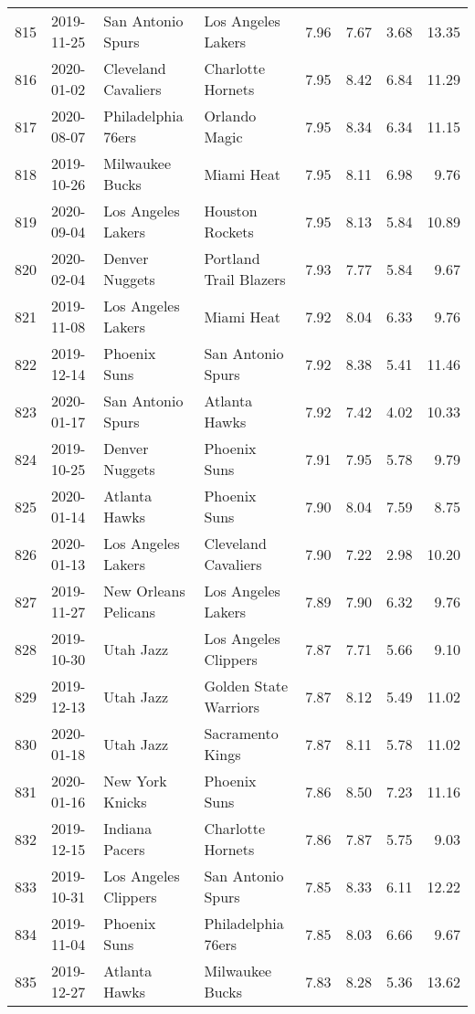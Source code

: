 \documentclass[
  11pt,
]{article}
\theoremstyle{nonumberplain}
\begin{document}
\begin{longtable}{rl|llr|rrr}
815 & 2019-11-25 & San Antonio Spurs & Los Angeles Lakers & 7.96 & 7.67 & 3.68 & 13.35\\
816 & 2020-01-02 & Cleveland Cavaliers & Charlotte Hornets & 7.95 & 8.42 & 6.84 & 11.29\\
817 & 2020-08-07 & Philadelphia 76ers & Orlando Magic & 7.95 & 8.34 & 6.34 & 11.15\\
818 & 2019-10-26 & Milwaukee Bucks & Miami Heat & 7.95 & 8.11 & 6.98 & 9.76\\
819 & 2020-09-04 & Los Angeles Lakers & Houston Rockets & 7.95 & 8.13 & 5.84 & 10.89\\
820 & 2020-02-04 & Denver Nuggets & Portland Trail Blazers & 7.93 & 7.77 & 5.84 & 9.67\\
821 & 2019-11-08 & Los Angeles Lakers & Miami Heat & 7.92 & 8.04 & 6.33 & 9.76\\
822 & 2019-12-14 & Phoenix Suns & San Antonio Spurs & 7.92 & 8.38 & 5.41 & 11.46\\
823 & 2020-01-17 & San Antonio Spurs & Atlanta Hawks & 7.92 & 7.42 & 4.02 & 10.33\\
824 & 2019-10-25 & Denver Nuggets & Phoenix Suns & 7.91 & 7.95 & 5.78 & 9.79\\
825 & 2020-01-14 & Atlanta Hawks & Phoenix Suns & 7.90 & 8.04 & 7.59 & 8.75\\
826 & 2020-01-13 & Los Angeles Lakers & Cleveland Cavaliers & 7.90 & 7.22 & 2.98 & 10.20\\
827 & 2019-11-27 & New Orleans Pelicans & Los Angeles Lakers & 7.89 & 7.90 & 6.32 & 9.76\\
828 & 2019-10-30 & Utah Jazz & Los Angeles Clippers & 7.87 & 7.71 & 5.66 & 9.10\\
829 & 2019-12-13 & Utah Jazz & Golden State Warriors & 7.87 & 8.12 & 5.49 & 11.02\\
830 & 2020-01-18 & Utah Jazz & Sacramento Kings & 7.87 & 8.11 & 5.78 & 11.02\\
831 & 2020-01-16 & New York Knicks & Phoenix Suns & 7.86 & 8.50 & 7.23 & 11.16\\
832 & 2019-12-15 & Indiana Pacers & Charlotte Hornets & 7.86 & 7.87 & 5.75 & 9.03\\
833 & 2019-10-31 & Los Angeles Clippers & San Antonio Spurs & 7.85 & 8.33 & 6.11 & 12.22\\
834 & 2019-11-04 & Phoenix Suns & Philadelphia 76ers & 7.85 & 8.03 & 6.66 & 9.67\\
835 & 2019-12-27 & Atlanta Hawks & Milwaukee Bucks & 7.83 & 8.28 & 5.36 & 13.62\\

\end{longtable}
\end{document}
